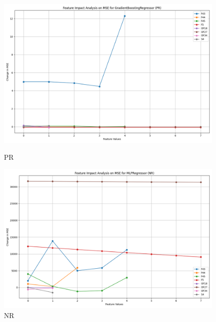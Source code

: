 \begin{figure}[H]
    \centering
    \begin{minipage}{0.495\textwidth}
        \centering
        \includegraphics[width=\linewidth]{analysis/images_reg/feature_impact_mse_PR_GradientBoostingRegressor.png}
        \caption{PR}
        \label{fig:pr_mse_analysis}
    \end{minipage}\hfill
    \begin{minipage}{0.495\textwidth}
        \centering
        \includegraphics[width=\linewidth]{analysis/images_reg/feature_impact_mse_NR_MLPRegressor.png}
        \caption{NR}
        \label{fig:nr_mse_analysis}
    \end{minipage}
\end{figure}

